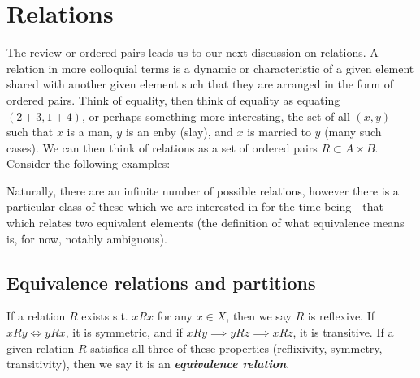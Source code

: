 \documentclass{report}
\begin{document}
\section{Relations}

The review or ordered pairs leads us to our next discussion on relations. A relation in more colloquial terms is a dynamic or characteristic of a given element shared with another given element such that they are arranged in the form of ordered pairs. Think of equality, then think of equality as equating \( (2+3,1+4) \), or perhaps something more interesting, the set of all \( (x,y) \) such that \( x \) is a man, \( y \) is an enby (slay), and \( x \) is married to \( y \) (many such cases). We can then think of relations as a set of ordered pairs \( R \subset A\times B \). Consider the following examples:

Naturally, there are an infinite number of possible relations, however there is a particular class of these which we are interested in for the time being---that which relates two equivalent elements (the definition of what equivalence means is, for now, notably ambiguous). 
\subsection{Equivalence relations and partitions}

If a relation \( R \) exists s.t. \( xRx \) for any \( x \in  X \), then we say \( R \) is reflexive. If \( xRy \iff yRx \), it is symmetric, and if \( xRy \implies yRz \implies xRz \), it is transitive. If a given relation \( R \) satisfies all three of these properties (reflixivity, symmetry, transitivity), then we say it is an \textbf{\textit{equivalence relation}}. 

\end{document}

